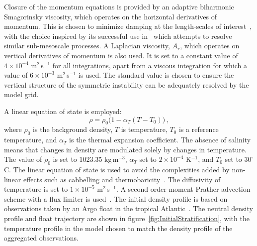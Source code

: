 Closure of the momentum equations is provided by an adaptive biharmonic Smagorinsky viscosity, which operates on the horizontal derivatives of momentum. This is chosen to minimize damping at the length-scales of interest~\citep{Smagorinsky1963, Griffies2000}, with the choice inspired by its successful use in~\citet{Brannigan2016} which attempts to resolve similar sub-mesoscale processes. A Laplacian viscosity, $A_r$, which operates on vertical derivatives of momentum is also used. It is set to a constant value of $4 \times 10^{-4}$ m$^2$\,s$^{-1}$ for all integrations, apart from a viscous integration for which a value of $6 \times 10^{-3}$ m$^2$\,s$^{-1}$ is used. The standard value is chosen to ensure the vertical structure of the symmetric instability can be adequately resolved by the model grid.

A linear equation of state is employed:
\begin{equation}
    \rho = \rho_{0} \big(1 - \alpha_T (T - T_0 )\big) \, ,
    \label{eq:EOS}
\end{equation}
where $\rho_{0}$ is the background density, $T$ is temperature, $T_0$ is a reference temperature, and $\alpha_T$ is the thermal expansion coefficient. The absence of salinity means that changes in density are modulated solely by changes in temperature. The value of $\rho_{0}$ is set to 1023.35 kg$\,$m$^{-3}$, $\alpha_T$  set to $2 \times 10^{-4}$ K$^{-1}$, and $T_0$ set to $30^{\circ}$C. The linear equation of state is used to avoid the complexities added by non-linear effects such as cabbelling and thermobaricity~\citep[e.g.][]{Groeskamp2016}. The diffusivity of temperature is set to $1 \times 10^{-5}$ m$^2$\,s$^{-1}$. A second order-moment Prather advection scheme with a flux limiter is used~\citep{Prather1986}. The initial density profile is based on observations taken by an Argo float in the tropical Atlantic~\citep{Argo2019}. The neutral density profile and float trajectory are shown in figure~\ref{fig:InitialStratification}, with the temperature profile in the model chosen to match the density profile of the aggregated observations.

